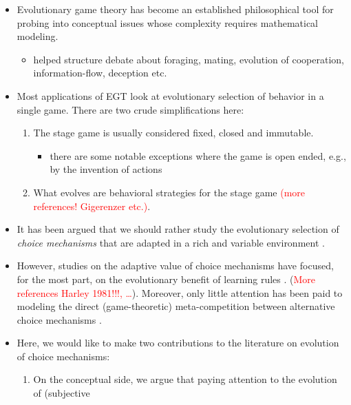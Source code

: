 \documentclass[fleqn,reqno,11pt]{article}
\newcommand{\myalert}[1]{\textcolor{red}{#1}}
\begin{document}
\begin{itemize}
\item Evolutionary game theory has become an established philosophical tool for probing into
  conceptual issues whose complexity requires mathematical modeling.
  \begin{itemize}
  \item helped structure debate about foraging, mating, evolution of cooperation,
    information-flow, deception etc.
  \end{itemize}
\item Most applications of EGT look at evolutionary selection of behavior in a single
  game. There are two crude simplifications here:
  \begin{enumerate}
  \item The stage game is usually considered fixed, closed and immutable.
    \begin{itemize}
    \item there are some notable exceptions where the game is open ended, e.g., by the
      invention of actions \citep{WordenLevin2007:Evolutionary-es,
        McKenzie-AlexanderSkymrs2012:Inventing-New-S}
    \end{itemize}
  \item What evolves are behavioral strategies for the stage game \citep[what][call the
    ``behavioral gamit'']{FawcettHamblin2013:Exposing-the-be} \myalert{(more references!
      Gigerenzer etc.)}.
  \end{enumerate}
\item It has been argued that we should rather study the evolutionary selection of \emph{choice
    mechanisms} that are adapted in a rich and variable environment
  \citep[e.g.,][]{FawcettHamblin2013:Exposing-the-be,McNamara2013:Towards-a-Riche}.
\item However, studies on the adaptive value of choice mechanisms have focused, for the most
  part, on the evolutionary benefit of learning rules
  \citep[e.g.,][]{ZollmanSmead2010:Plasticity-and-,SmeadZollman2013:The-Stability-o}. (\myalert{More references Harley 1981!!!, \dots}). 
    Moreover, only little attention has been paid to
  modeling the direct (game-theoretic) meta-competition between alternative choice mechanisms
  \citep[see][for related criticism]{FawcettHamblin2013:Exposing-the-be}.
\item Here, we would like to make two contributions to the literature on evolution of choice
  mechanisms:
  \begin{enumerate}
  \item On the conceptual side, we argue that paying attention to the evolution of (subjective

\end{enumerate}
\end{itemize}
\end{document}
